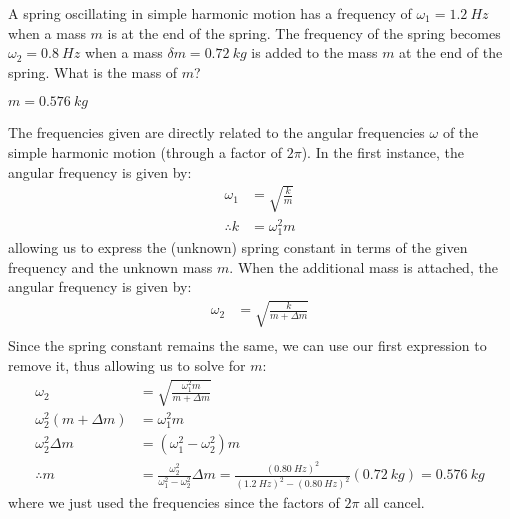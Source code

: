 \question A spring oscillating in simple harmonic motion has a frequency of $\omega_1 = \SI{1.2}{Hz}$ when a mass $m$ is at the end of the spring. The frequency of the spring becomes $\omega_2 = \SI{0.8}{Hz}$ when a mass $\delta m = \SI{0.72}{kg}$ is added to the mass $m$ at the end of the spring. What is the mass of $m$?
\begin{finalanswer}
	$m = \SI{0.576}{kg}$
\end{finalanswer}
\begin{solution}
	The frequencies given are directly related to the angular frequencies $\omega$ of the simple harmonic motion (through a factor of $2\pi$). In the first instance, the angular frequency is given by:
	\begin{align*}
	\omega_1 &= \sqrt{\frac{k}{m}}\\
	\therefore k&=\omega_1^2m
	\end{align*}
	allowing us to express the (unknown) spring constant in terms of the given frequency and the unknown mass $m$. When the additional mass is attached, the angular frequency is given by:
	\begin{align*}
	\omega_2 &= \sqrt{\frac{k}{m+\Delta m}}\\
	\end{align*}
	Since the spring constant remains the same, we can use our first expression to remove it, thus allowing us to solve for $m$:
	\begin{align*}
	\omega_2 &= \sqrt{\frac{\omega_1^2m}{m+\Delta m}}\\
	\omega_2^2(m+\Delta m)&=\omega_1^2m\\
	\omega_2^2\Delta m&=(\omega_1^2-\omega_2^2)m\\
	\therefore m&=\frac{\omega_2^2}{\omega_1^2-\omega_2^2}\Delta m=\frac{(\SI{0.80}{Hz})^2}{(\SI{1.2}{Hz})^2-(\SI{0.80}{Hz})^2}(\SI{0.72}{kg})=\SI{0.576}{kg}
	\end{align*}
	where we just used the frequencies since the factors of $2\pi$ all cancel. 
\end{solution}

